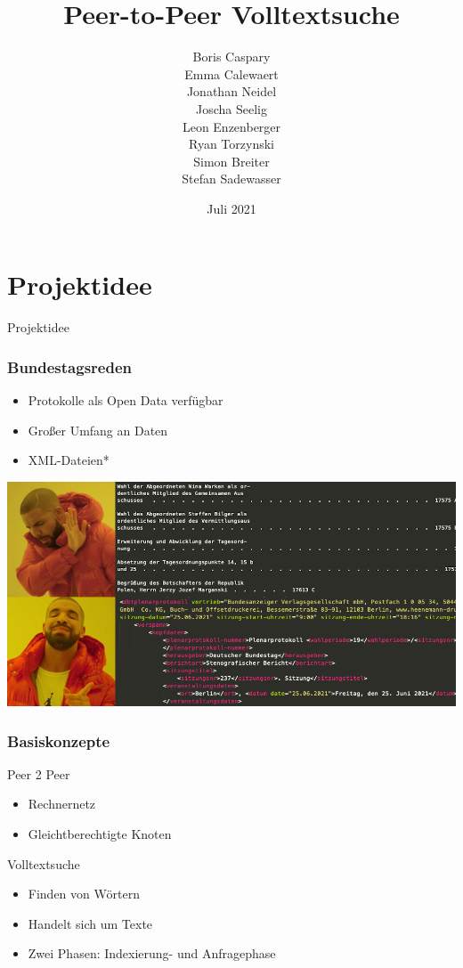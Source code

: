 \documentclass{beamer}
\title{Peer-to-Peer Volltextsuche}
\subtitle{}
\author{
  Boris Caspary \\
  Emma Calewaert \\
  Jonathan Neidel \\
  Joscha Seelig \\
  Leon Enzenberger \\
  Ryan Torzynski \\
  Simon Breiter \\
  Stefan Sadewasser \\
}
\date{Juli 2021}
\institute{HTW Berlin, Angewandte Informatik, Projektstudium bei Herr Hoppe}
\begin{document}
\frame{\titlepage}

\section{Projektidee}
\begin{frame}
  \begin{center}
    {\Huge Projektidee}
  \end{center}
\end{frame}

\begin{frame}
  \frametitle{Bundestagsreden}
  \begin{itemize}
    \item Protokolle als Open Data verfügbar
    \item Großer Umfang an Daten
    \item XML-Dateien*
  \end{itemize}
\end{frame}

\begin{frame}
    \hspace*{-10.75mm}
    \includegraphics[width=\paperwidth]{drakememe}
\end{frame}

\begin{frame}[allowframebreaks]
  \frametitle{Basiskonzepte}
  Peer 2 Peer
  \begin{itemize}
    \item Rechnernetz
    \item Gleichtberechtigte Knoten
  \end{itemize}

  \break
  Volltextsuche
    \begin{itemize}
    \item Finden von Wörtern
    \item Handelt sich um Texte
    \item Zwei Phasen: Indexierung- und Anfragephase
  \end{itemize}
\end{frame}
\end{document}
